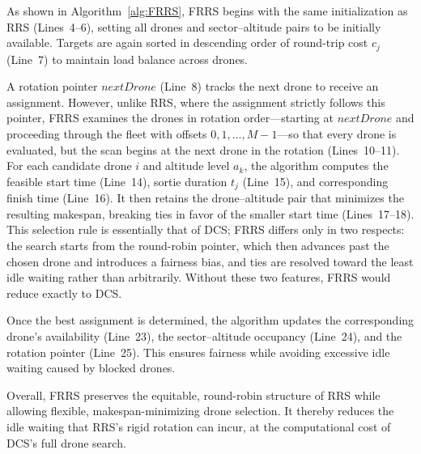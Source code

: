 \documentclass[subscriptcorrection,upint,nolists, varvw,barcolor=Goldenrod3,mathalfa=cal=euler,balance,hyphenate,french]{asmejour} %
\begin{document}
As shown in Algorithm~\ref{alg:FRRS}, FRRS begins with the same initialization as RRS (Lines~4–6), setting all drones and sector–altitude pairs to be initially available.  
Targets are again sorted in descending order of round-trip cost $c_j$ (Line~7) to maintain load balance across drones.

A rotation pointer $\mathit{nextDrone}$ (Line~8) tracks the next drone to receive an assignment.  
However, unlike RRS, where the assignment strictly follows this pointer, FRRS examines the drones in rotation order---starting at $\mathit{nextDrone}$ and proceeding through the fleet with offsets $0,1,\dots,M-1$---so that every drone is evaluated, but the scan begins at the next drone in the rotation (Lines~10–11).
For each candidate drone $i$ and altitude level $a_k$, the algorithm computes the feasible start time (Line~14), sortie duration $t_j$ (Line~15), and corresponding finish time (Line~16).
It then retains the drone--altitude pair that minimizes the resulting makespan, breaking ties in favor of the smaller start time (Lines~17–18).
This selection rule is essentially that of DCS; FRRS differs only in two respects: the search starts from the round-robin pointer, which then advances past the chosen drone and introduces a fairness bias, and ties are resolved toward the least idle waiting rather than arbitrarily. Without these two features, FRRS would reduce exactly to DCS.

Once the best assignment is determined, the algorithm updates the corresponding drone’s availability (Line~23), the sector–altitude occupancy (Line~24), and the rotation pointer (Line~25).  
This ensures fairness while avoiding excessive idle waiting caused by blocked drones.

Overall, FRRS preserves the equitable, round-robin structure of RRS while allowing flexible, makespan-minimizing drone selection. It thereby reduces the idle waiting that RRS's rigid rotation can incur, at the computational cost of DCS's full drone search.
\fi
\end{document}
